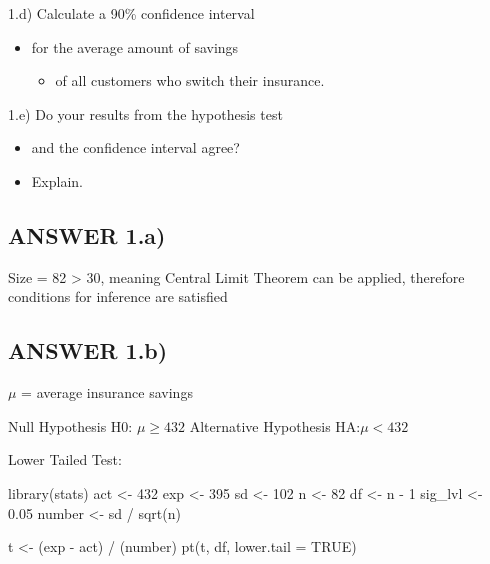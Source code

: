 \documentclass[
]{article}
\newenvironment{Shaded}{\begin{snugshade}}{\end{snugshade}}
\newcommand{\AttributeTok}[1]{\textcolor[rgb]{0.77,0.63,0.00}{#1}}
\newcommand{\ConstantTok}[1]{\textcolor[rgb]{0.00,0.00,0.00}{#1}}
\newcommand{\DecValTok}[1]{\textcolor[rgb]{0.00,0.00,0.81}{#1}}
\newcommand{\FloatTok}[1]{\textcolor[rgb]{0.00,0.00,0.81}{#1}}
\newcommand{\FunctionTok}[1]{\textcolor[rgb]{0.00,0.00,0.00}{#1}}
\newcommand{\NormalTok}[1]{#1}
\newcommand{\OtherTok}[1]{\textcolor[rgb]{0.56,0.35,0.01}{#1}}
\newcommand{\SpecialCharTok}[1]{\textcolor[rgb]{0.00,0.00,0.00}{#1}}
\providecommand{\tightlist}{%
  \setlength{\itemsep}{0pt}\setlength{\parskip}{0pt}}
\begin{document}
1.d) Calculate a 90\% confidence interval

\begin{itemize}
\tightlist
\item
  for the average amount of savings

  \begin{itemize}
  \tightlist
  \item
    of all customers who switch their insurance.
  \end{itemize}
\end{itemize}

1.e) Do your results from the hypothesis test

\begin{itemize}
\tightlist
\item
  and the confidence interval agree?
\item
  Explain.
\end{itemize}

\hypertarget{answer-1.a}{%
\subsection{ANSWER 1.a)}\label{answer-1.a}}

Size = 82 \textgreater{} 30, meaning Central Limit Theorem can be
applied, therefore conditions for inference are satisfied

\hypertarget{answer-1.b}{%
\subsection{ANSWER 1.b)}\label{answer-1.b}}

\(\mu\) = average insurance savings

Null Hypothesis H0: \(\mu \ge 432\) Alternative Hypothesis
HA:\(\mu < 432\)

Lower Tailed Test:

\begin{Shaded}
\begin{Highlighting}[]
\FunctionTok{library}\NormalTok{(stats)}
\NormalTok{act }\OtherTok{\textless{}{-}} \DecValTok{432}
\NormalTok{exp }\OtherTok{\textless{}{-}} \DecValTok{395}
\NormalTok{sd }\OtherTok{\textless{}{-}} \DecValTok{102}
\NormalTok{n }\OtherTok{\textless{}{-}} \DecValTok{82}
\NormalTok{df }\OtherTok{\textless{}{-}}\NormalTok{ n }\SpecialCharTok{{-}} \DecValTok{1}
\NormalTok{sig\_lvl }\OtherTok{\textless{}{-}} \FloatTok{0.05}
\NormalTok{number }\OtherTok{\textless{}{-}}\NormalTok{ sd }\SpecialCharTok{/} \FunctionTok{sqrt}\NormalTok{(n)}

\NormalTok{t }\OtherTok{\textless{}{-}}\NormalTok{ (exp }\SpecialCharTok{{-}}\NormalTok{ act) }\SpecialCharTok{/}\NormalTok{ (number)}
\FunctionTok{pt}\NormalTok{(t, df, }\AttributeTok{lower.tail =} \ConstantTok{TRUE}\NormalTok{)}
\end{Highlighting}
\end{Shaded}
\end{document}
